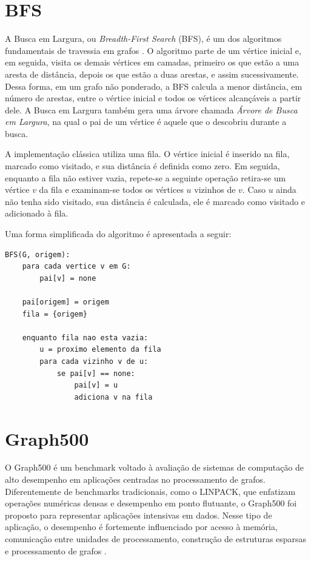 \section{BFS}
A Busca em Largura, ou \textit{Breadth-First Search} (BFS), é um dos algoritmos fundamentais de travessia em grafos \cite{cormenalgorithms}. O algoritmo parte de um vértice inicial e, em seguida, visita os demais vértices em camadas, primeiro os que estão a uma aresta de distância, depois os que estão a duas arestas, e assim sucessivamente. Dessa forma, em um grafo não ponderado, a BFS calcula a menor distância, em número de arestas, entre o vértice inicial e todos os vértices alcançáveis a partir dele. A Busca em Largura também gera uma árvore chamada \textit{Árvore de Busca em Largura}, na qual o pai de um vértice é aquele que o descobriu durante a busca.

A implementação clássica utiliza uma fila. O vértice inicial é inserido na fila, marcado como visitado, e sua distância é definida como zero. Em seguida, enquanto a fila não estiver vazia, repete-se a seguinte operação retira-se um vértice $v$ da fila e examinam-se todos os vértices $u$ vizinhos de $v$. Caso $u$ ainda não tenha sido visitado, sua distância é calculada, ele é marcado como visitado e adicionado à fila.

Uma forma simplificada do algoritmo é apresentada a seguir:

\begin{lstlisting}
BFS(G, origem):
	para cada vertice v em G:
        pai[v] = none

    pai[origem] = origem
    fila = {origem}

    enquanto fila nao esta vazia:
		u = proximo elemento da fila
		para cada vizinho v de u:
			se pai[v] == none:
				pai[v] = u
				adiciona v na fila
\end{lstlisting}

\section{Graph500}
\label{sec:graph500-intro}

O Graph500 é um benchmark voltado à avaliação de sistemas 
de computação de alto desempenho em aplicações centradas no processamento de grafos. 
Diferentemente de benchmarks tradicionais, como o LINPACK, que enfatizam operações 
numéricas densas e desempenho em ponto flutuante, 
o Graph500 foi proposto para representar aplicações intensivas em dados. 
Nesse tipo de aplicação, o desempenho é fortemente influenciado por acesso à memória, 
comunicação entre unidades de processamento, construção de estruturas esparsas e processamento de grafos \cite{murphygraph500, graph500spec}.

